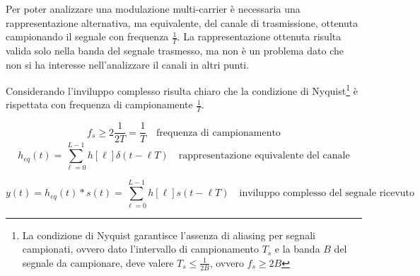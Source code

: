 \begin{center}
{
    }
\end{center}
Per poter analizzare una modulazione multi-carrier è necessaria una rappresentazione alternativa, ma equivalente, del canale di trasmissione, ottenuta campionando il segnale con frequenza $\frac{1}{T}$. La rappresentazione ottenuta risulta valida solo nella banda del segnale trasmesso, ma non è un problema dato che non si ha interesse nell'analizzare il canali in altri punti.

Considerando l'inviluppo complesso risulta chiaro che la condizione di Nyquist\footnote{\label{nyquist_cond} La condizione di Nyquist garantisce l'assenza di aliasing per segnali campionati, ovvero dato l'intervallo di campionamento $T_s$ e la banda $B$ del segnale da campionare, deve valere $T_s \leq \frac{1}{2B}$, ovvero $f_s \geq 2B$} è rispettata con frequenza di campionamente $\frac{1}{T}$.



\[
    f_s \geq 2 \frac{1}{2T} = \frac{1}{T} \quad \text{frequenza di campionamento} 
\]
\[
    h_{eq}(t) = \sum_{\ell=0}^{L-1} h \left[\ell\right] \delta(t - \ell T) \quad \text{rappresentazione equivalente del canale}
\]

\[
    y(t) = h_{eq}(t) \ast s(t) = \sum_{\ell=0}^{L-1} h\left[\ell\right] s(t - \ell T) \quad \text{inviluppo complesso del segnale ricevuto}
\]

